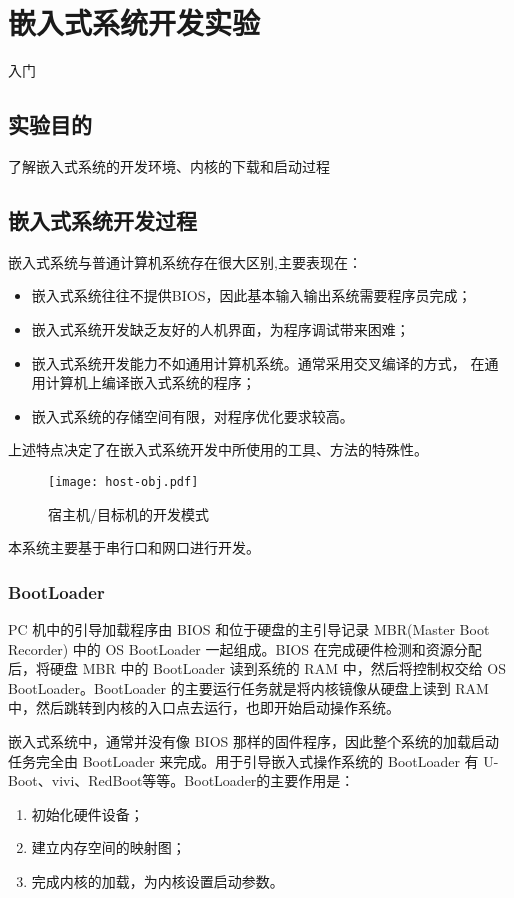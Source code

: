 \chapter{嵌入式系统开发实验}{入门}\label{ch-env}

\section{实验目的}
    了解嵌入式系统的开发环境、内核的下载和启动过程

\section{嵌入式系统开发过程}
    嵌入式系统与普通计算机系统存在很大区别,主要表现在：
\begin{itemize}
  \item 嵌入式系统往往不提供BIOS，因此基本输入输出系统需要程序员完成；
  \item 嵌入式系统开发缺乏友好的人机界面，为程序调试带来困难；
  \item 嵌入式系统开发能力不如通用计算机系统。通常采用交叉编译的方式，
        在通用计算机上编译嵌入式系统的程序；
  \item 嵌入式系统的存储空间有限，对程序优化要求较高。
\end{itemize}
    上述特点决定了在嵌入式系统开发中所使用的工具、方法的特殊性。

\begin{figure}[!ht]
\centering
\texttt{[image: host-obj.pdf]}
\caption{宿主机/目标机的开发模式}
\end{figure}

    本系统主要基于串行口和网口进行开发。

\subsection{BootLoader}
PC 机中的引导加载程序由 BIOS 和位于硬盘的主引导记录 MBR(Master Boot
Recorder) 中的 OS BootLoader 一起组成。BIOS 在完成硬件检测和资源分配
后，将硬盘 MBR 中的 BootLoader 读到系统的 RAM 中，然后将控制权交给
OS BootLoader。BootLoader 的主要运行任务就是将内核镜像从硬盘上读到
RAM 中，然后跳转到内核的入口点去运行，也即开始启动操作系统。

	嵌入式系统中，通常并没有像 BIOS 那样的固件程序，因此整个系统的加载启动
任务完全由 BootLoader 来完成。用于引导嵌入式操作系统的 BootLoader 有
U-Boot、vivi、RedBoot等等。BootLoader的主要作用是：
\begin{enumerate}
  \item 初始化硬件设备；
  \item 建立内存空间的映射图；
  \item 完成内核的加载，为内核设置启动参数。
\end{enumerate}

